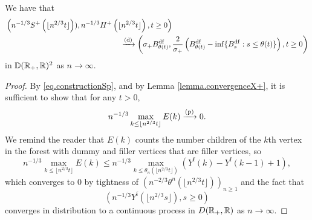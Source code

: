 \begin{lemma}\label{lemma.subtracterrorconverges}
We have that 
\begin{align*}
& \left(n^{-1/3}S^{+}\left(\lfloor n^{2/3}t\rfloor \right)), n^{-1/3}H^{+}\left(\lfloor n^{2/3}t\rfloor \right) ,t\geq 0 \right) \\
& \hspace{15em} \todist \left(\sigma_+ B^{\mathrm{df}}_{\theta (t)},\frac{2}{\sigma_+} \left(B^{\mathrm{df}}_{\theta (t)}-\inf\{B^{\mathrm{df}}_{s}:s\leq \theta(t)\}\right) ,t\geq 0 \right)
\end{align*}
in ${\mathbb D}({\mathbb R}_+,{\mathbb R})^2$ as $n\to \infty$. 
\end{lemma}


\begin{proof}
By \eqref{eq.constructionSp}, and by Lemma \ref{lemma.convergenceX+}, it is sufficient to show that for any $t>0$,
$$n^{-1/3}\max_{k\leq \lfloor n^{2/3}t\rfloor}E(k)\xrightarrow[]{\mathrm{(p)}}0.$$
We remind the reader that $E(k)$ counts the number children of the $k$th vertex in the forest with dummy and filler vertices that are filler vertices, so
$$n^{-1/3}\max_{k\leq \lfloor n^{2/3}t\rfloor}E(k)\leq n^{-1/3}\max_{k\leq \theta_n(\lfloor n^{2/3}t\rfloor)}(Y^{\mathrm{f}}(k)-Y^{\mathrm{f}}(k-1)+1),$$
which converges to $0$ by tightness of $\left(n^{-2/3}\theta^{n}(\lfloor n^{2/3}t\rfloor)\right)_{n\geq 1}$ and the fact that $$\left(n^{-1/3}Y^{\mathrm{f}}\left(\lfloor n^{2/3}s\rfloor\right),s\geq 0\right)$$ converges in distribution to a continuous process in $D({\mathbb R}_+,{\mathbb R})$ as $n\to\infty$.
\end{proof}

